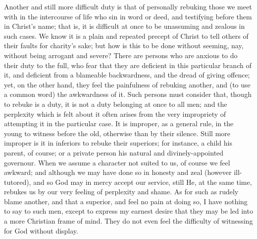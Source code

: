 Another and still more difficult duty is that of
personally rebuking those we meet with in the intercourse
of life who sin in word or deed, and testifying before
them in Christ's name; that is, it is difficult at once
to be unassuming and zealous in such cases. We know it is
a plain and repeated precept of Christ to tell others of
their faults for charity's sake; but how is this to be
done without seeming, nay, without being arrogant and
severe? There are persons who are anxious to do their
duty to the full, who fear that they are deficient in
this particular branch of it, and deficient from a
blameable backwardness, and the dread of giving offence;
yet, on the other hand, they feel the painfulness of
rebuking another, and (to use a common word) the
awkwardness of it. Such persons must consider that,
though to rebuke is a duty, it is not a duty belonging at
once to all men; and the perplexity which is felt about
it often arises from the very impropriety of attempting
it in the particular case. It is improper, as a general
rule, in the young to witness before the old, otherwise
than by their silence. Still more improper is it in
inferiors to rebuke their superiors; for instance, a
child his parent, of course; or a private person his
natural and divinely-appointed governour. When we assume
a character not suited to us, of course we feel awkward;
and although we may have done so in honesty and zeal
(however ill-tutored), and so God may in mercy accept our
service, still He, at the same time, rebukes us by our
very feeling of perplexity and shame. As for such as
rudely blame another, and that a superior, and feel no
pain at doing so, I have nothing to say to such men,
except to express my earnest desire that they may be led
into a more Christian frame of mind. They do not even
feel the difficulty of witnessing for God without
display.

